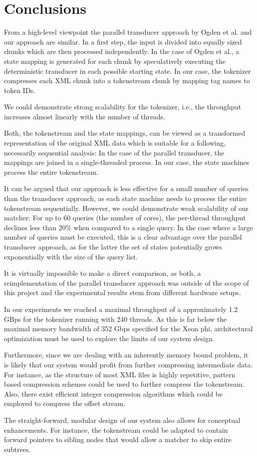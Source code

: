 \section{Conclusions}

From a high-level viewpoint the parallel transducer approach by Ogden et
al.\cite{Ogden2013} and our approach are similar. In a first step, the input is
divided into equally sized chunks which are then processed independently. In the
case of Ogden et al., a state mapping is generated for each chunk by
speculatively executing the deterministic transducer in each possible starting
state. In our case, the tokenizer compresses each XML chunk into a tokenstream
chunk by mapping tag names to token IDs.

We could demonstrate strong scalability for the tokenizer, i.e., the throughput
increases almost linearly with the number of threads.

Both, the tokenstream and the state mappings, can be viewed as a transformed
representation of the original XML data which is suitable for a following,
necessarily sequential analysis: In the case of the parallel transducer, the
mappings are joined in a single-threaded process. In our case, the state
machines process the entire tokenstream.

It can be argued that our approach is less effective for a small number of
queries than the transducer approach, as each state machine needs to process the
entire tokenstream sequentially. However, we could demonstrate weak scalability
of our matcher: For up to 60 queries (the number of cores), the per-thread
throughput declines less than 20\% when compared to a single query. In the case
where a large number of queries must be executed, this is a clear advantage over
the parallel transducer approach, as for the latter the set of states
potentially grows exponentially with the size of the query list.

It is virtually impossible to make a direct comparison, as both, a
reimplementation of the parallel transducer approach was outside of the scope of
this project and the experimental results stem from different hardware setups.

In our experiments we reached a maximal throughput of a approximately 1.2 GBps
for the tokenizer running with 240 threads. As this is far below the maximal
memory bandwidth of 352 Gbps specified for the Xeon phi\cite{IntelXeon},
architectural optimization must be used to explore the limits of our system
design.

Furthermore, since we are dealing with an inherently memory bound problem, it is
likely that our system would profit from further compressing intermediate data.
For instance, as the structure of most XML files is highly repetitive, pattern
based compression schemes could be used to further compress the tokenstream.
Also, there exist efficient integer compression algorithms which could be
employed to compress the offset stream\cite{Lemire2014}.

The straight-forward, modular design of our system also allows for conceptual
enhancements. For instance, the tokenstream could be adapted to contain forward
pointers to sibling nodes that would allow a matcher to skip entire subtrees.
